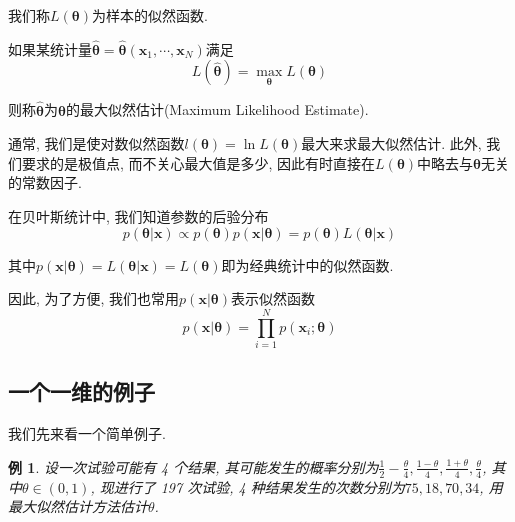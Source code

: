 \documentclass[a4paper,UTF8]{ctexart}
\theoremstyle{plain} \newtheorem{theorem}{定理}[section]
\theoremstyle{plain} \newtheorem{definition}{定义}[section]
\theoremstyle{plain} \newtheorem{lemma}{引理}[section]
\theoremstyle{plain} \newtheorem{proposition}{命题}[section]
\theoremstyle{plain} \newtheorem{example}{例}
\theoremstyle{plain} \newtheorem{remark}{注}
\theoremstyle{plain} \newtheorem{corollary}{推论}[section]
\begin{document}
我们称$L(\bm{\theta})$为样本的似然函数.

如果某统计量$\hat{\bm{\theta}} = \hat{\bm{\theta}}(\bm{x}_{1},\cdots,\bm{x}_{N})$满足
\begin{equation*}
L(\hat{\bm{\theta}}) = \max_{\bm{\theta}} L(\bm{\theta})
\end{equation*}

则称$\hat{\bm{\theta}}$为$\bm{\theta}$的最大似然估计(Maximum Likelihood Estimate).

通常, 我们是使对数似然函数$l(\bm{\theta}) = \ln L(\bm{\theta})$最大来求最大似然估计. 此外, 我们要求的是极值点, 而不关心最大值是多少, 因此有时直接在$L(\bm{\theta})$中略去与$\bm{\theta}$无关的常数因子.

在贝叶斯统计中, 我们知道参数的后验分布
\begin{equation*}
p(\bm{\theta} | \bm{x}) \propto p(\bm{\theta}) p(\bm{x} | \bm{\theta}) = p(\bm{\theta}) L(\bm{\theta} | \bm{x})
\end{equation*}

其中$p(\bm{x} | \bm{\theta}) = L(\bm{\theta} | \bm{x}) = L(\bm{\theta})$即为经典统计中的似然函数.

因此, 为了方便, 我们也常用$p(\bm{x} | \bm{\theta})$表示似然函数
\begin{equation*}
p(\bm{x} | \bm{\theta}) = \prod_{i=1}^{N} p(\bm{x}_{i}; \bm{\theta})
\end{equation*}




\subsection{一个一维的例子}
我们先来看一个简单例子.

\begin{example}
设一次试验可能有 4 个结果, 其可能发生的概率分别为$\frac{1}{2} - \frac{\theta}{4}, \frac{1 - \theta}{4}, \frac{1 + \theta}{4}, \frac{\theta}{4}$, 其中$\theta \in (0, 1)$, 现进行了 197 次试验, 4 种结果发生的次数分别为$75,18,70,34$, 用最大似然估计方法估计$\theta$.
\end{example}
\end{document}
